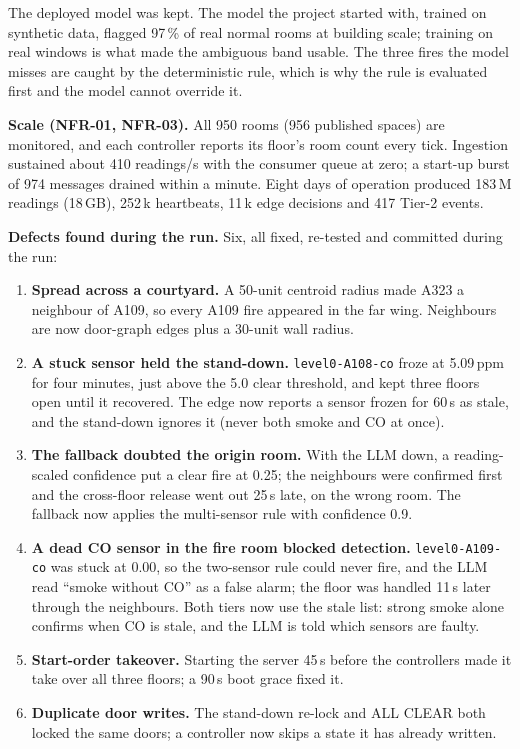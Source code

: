 \documentclass[11pt]{article}
\providecommand{\tightlist}{\setlength{\itemsep}{0pt}\setlength{\parskip}{0pt}}
\begin{document}
The deployed model was kept. The model the project started with, trained on synthetic data, 
flagged 97\,\% of real normal rooms at building scale; training on real windows is what made 
the ambiguous band usable. The three fires the model misses are caught by the deterministic 
rule, which is why the rule is evaluated first and the model cannot override it.

\textbf{Scale (NFR-01, NFR-03).} All 950 rooms (956 published spaces) are monitored, and each 
controller reports its floor's room count every tick. Ingestion sustained about 410 readings/s 
with the consumer queue at zero; a start-up burst of 974 messages drained within a minute. Eight 
days of operation produced 183\,M readings (18\,GB), 252\,k heartbeats, 11\,k edge decisions and 
417 Tier-2 events.

\textbf{Defects found during the run.} Six, all fixed, re-tested and committed during the run:
\begin{enumerate}\tightlist
  \item \textbf{Spread across a courtyard.} A 50-unit centroid radius made A323 a neighbour of 
  A109, so every A109 fire appeared in the far wing. Neighbours are now door-graph edges plus a 
  30-unit wall radius.
  \item \textbf{A stuck sensor held the stand-down.} \texttt{level0-A108-co} froze at 5.09\,ppm 
  for four minutes, just above the 5.0 clear threshold, and kept three floors open until it 
  recovered. The edge now reports a sensor frozen for 60\,s as stale, and the stand-down ignores 
  it (never both smoke and CO at once).
  \item \textbf{The fallback doubted the origin room.} With the LLM down, a reading-scaled 
  confidence put a clear fire at 0.25; the neighbours were confirmed first and the cross-floor 
  release went out 25\,s late, on the wrong room. The fallback now applies the multi-sensor rule 
  with confidence 0.9.
  \item \textbf{A dead CO sensor in the fire room blocked detection.} \texttt{level0-A109-co} 
  was stuck at 0.00, so the two-sensor rule could never fire, and the LLM read ``smoke without 
  CO'' as a false alarm; the floor was handled 11\,s later through the neighbours. Both tiers 
  now use the stale list: strong smoke alone confirms when CO is stale, and the LLM is told 
  which sensors are faulty.
  \item \textbf{Start-order takeover.} Starting the server 45\,s before the controllers made it 
  take over all three floors; a 90\,s boot grace fixed it.
  \item \textbf{Duplicate door writes.} The stand-down re-lock and ALL CLEAR both locked the 
  same doors; a controller now skips a state it has already written.
\end{enumerate}
\end{document}
